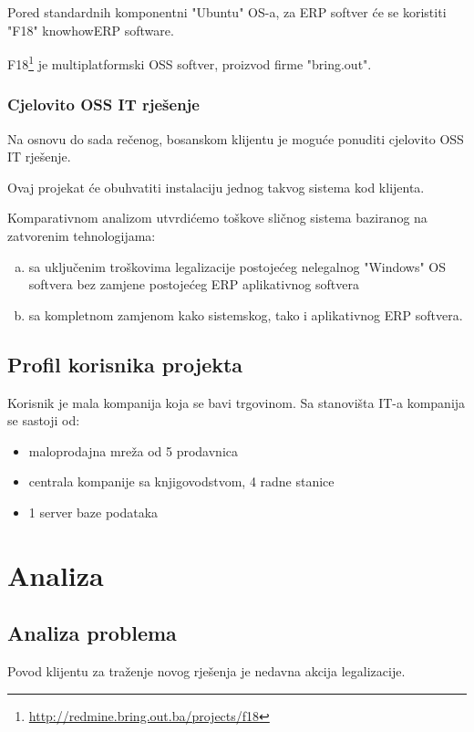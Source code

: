 \documentclass[times, utf8, seminar]{fit}
\begin{document}
Pored standardnih komponentni "Ubuntu" OS-a, za ERP softver će se koristiti "F18" knowhowERP software.

F18\footnote{\url{http://redmine.bring.out.ba/projects/f18}} je multiplatformski OSS softver, proizvod firme "bring.out".  

\subsection{Cjelovito OSS IT rješenje}
Na osnovu do sada rečenog, bosanskom klijentu je moguće ponuditi cjelovito OSS IT rješenje.  

Ovaj projekat će obuhvatiti instalaciju jednog takvog sistema kod klijenta.

Komparativnom analizom utvrdićemo toškove sličnog sistema baziranog na zatvorenim tehnologijama:
\begin{enumerate}[(a)]
  \item sa uključenim troškovima legalizacije postojećeg nelegalnog "Windows" OS softvera bez zamjene postojećeg ERP aplikativnog softvera
  \item sa kompletnom zamjenom kako sistemskog, tako i aplikativnog ERP softvera.  
\end{enumerate}

\section{Profil korisnika projekta}
Korisnik je mala kompanija koja se bavi trgovinom. Sa stanovišta IT-a kompanija se sastoji od:
\begin{itemize}
  \item maloprodajna mreža od 5 prodavnica
  \item centrala kompanije sa knjigovodstvom, 4 radne stanice
  \item 1 server baze podataka 
\end{itemize}

\chapter{Analiza}

\section{Analiza problema}

Povod klijentu za traženje novog rješenja je nedavna akcija legalizacije. 
\end{document}
